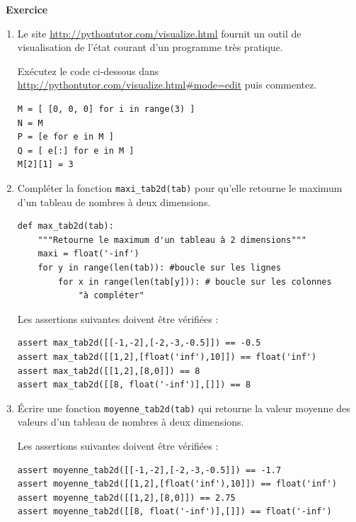 \documentclass[a4paper, french, 12pt]{article}
\newcounter{exo}
\newenvironment{exercice}[1]
{\par \medskip   \addtocounter{exo}{1} \noindent  
\begin{bclogo}[arrondi =0.1,   noborder = true, logo=\bccrayon, marge=4]{~\textbf{Exercice} \textbf{\theexo} {\itshape #1} }  \par}
{
\end{bclogo}
 \par \bigskip }
\newcounter{def}
\newcounter{prog}
\begin{document}
\begin{exercice}{}

\begin{enumerate}
	\item Le site \url{http://pythontutor.com/visualize.html} fournit un outil de visualisation de l'état courant d'un programme très pratique. 

Exécutez le code ci-dessous dans \url{http://pythontutor.com/visualize.html#mode=edit} puis commentez.

\begin{lstlisting}[style=rond]
M = [ [0, 0, 0] for i in range(3) ]
N = M
P = [e for e in M ]
Q = [ e[:] for e in M ]
M[2][1] = 3
\end{lstlisting}


\item Compléter la  fonction \texttt{maxi\_tab2d(tab)} pour qu'elle retourne le maximum d'un tableau de nombres à deux dimensions.


\begin{lstlisting}[style=rond]
def max_tab2d(tab):
    """Retourne le maximum d'un tableau à 2 dimensions"""
    maxi = float('-inf')
    for y in range(len(tab)): #boucle sur les lignes
        for x in range(len(tab[y])): # boucle sur les colonnes
            "à compléter"
\end{lstlisting}


Les assertions suivantes doivent être vérifiées :

\begin{lstlisting}[style=rond]
assert max_tab2d([[-1,-2],[-2,-3,-0.5]]) == -0.5
assert max_tab2d([[1,2],[float('inf'),10]]) == float('inf')
assert max_tab2d([[1,2],[8,0]]) == 8
assert max_tab2d([[8, float('-inf')],[]]) == 8
\end{lstlisting}


\item Écrire une fonction  \texttt{moyenne\_tab2d(tab)} qui retourne la valeur moyenne des valeurs  d'un tableau de nombres à deux dimensions.

Les assertions suivantes doivent être vérifiées :

\begin{lstlisting}[style=rond]
assert moyenne_tab2d([[-1,-2],[-2,-3,-0.5]]) == -1.7
assert moyenne_tab2d([[1,2],[float('inf'),10]]) == float('inf')
assert moyenne_tab2d([[1,2],[8,0]]) == 2.75
assert moyenne_tab2d([[8, float('-inf')],[]]) == float('-inf')
\end{lstlisting}


\end{enumerate}


\end{exercice}
\end{document}

